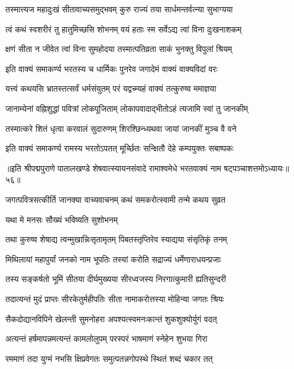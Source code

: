 \twolineshloka
{तस्मात्त्यज महादुःखं सीतावाच्यसमुद्भवम्}
{कुरु राज्यं तया सार्धमन्तर्वत्न्या सुभाग्यया}%

\twolineshloka
{त्वं कथं स्वशरीरं तु हातुमिच्छसि शोभनम्}
{वयं हताः स्म सर्वेऽद्य त्वां विना दुःखनाशकम्}%

\twolineshloka
{क्षणं सीता न जीवेत त्वां विना सुमहोदया}
{तस्मात्पतिव्रता साकं भुनक्तु विपुलां श्रियम्}%

\twolineshloka
{इति वाक्यं समाकर्ण्य भरतस्य च धार्मिकः}
{पुनरेव जगादेमं वाक्यं वाक्यविदां वरः}%

\twolineshloka
{यत्त्वं कथयसि भ्रातस्तत्सर्वं धर्मसंयुतम्}
{परं यद्वच्म्यहं वाक्यं तत्कुरुष्व ममाज्ञया}%

\twolineshloka
{जानाम्येनां वह्निशुद्धां पवित्रां लोकपूजिताम्}
{लोकापवादाद्भीतोऽहं त्यजामि स्वां तु जानकीम्}%

\twolineshloka
{तस्मात्करे शितं धृत्वा करवालं सुदारुणम्}
{शिरश्छिन्ध्यथवा जायां जानकीं मुञ्च वै वने}%

\twolineshloka
{इति वाक्यं समाकर्ण्य रामस्य भरतोऽपतत्}
{मूर्च्छितः सन्क्षितौ देहे कम्पयुक्तः सबाष्पकः}%

॥इति श्रीपद्मपुराणे पातालखण्डे शेषवात्स्यायनसंवादे रामाश्वमेधे भरतवाक्यं नाम षट्पञ्चाशत्तमोऽध्यायः॥५६॥



\twolineshloka
{जगत्पवित्रसत्कीर्ति जानक्या वाच्यवाचनम्}
{कथं समकरोत्स्वामी तन्मे कथय सुव्रत}%

यथा मे मनसः सौख्यं भविष्यति सुशोभनम्

\twolineshloka
{तथा कुरुष्व शेषाद्य त्वन्मुखान्निःसृतामृतम्}
{पिबतस्तृप्तिरेव स्याद्यया संसृतिकृं तनम्}%


\twolineshloka
{मिथिलायां महापुर्यां जनको नाम भूपतिः}
{तस्यां करोति सद्राज्यं धर्मेणाराधयन्प्रजाः}%

\twolineshloka
{तस्य सङ्कर्षतो भूमिं सीतया दीर्घमुख्यया}
{सीरध्वजस्य निरगात्कुमारी ह्यतिसुन्दरी}%

\twolineshloka
{तदात्यन्तं मुदं प्राप्तः सीरकेतुर्महीपतिः}
{सीता नामाकरोत्तस्या मोहिन्या जगतः श्रियः}%

\twolineshloka
{सैकदोद्यानविपिने खेलन्ती सुमनोहरा}
{अपश्यत्स्वमनःकान्तं शुकशुक्योर्युगं वदत्}%

\twolineshloka
{अत्यन्तं हर्षमापन्नमत्यन्तं कामलोलुपम्}
{परस्परं भाषमाणं स्नेहेन शुभया गिरा}%

\twolineshloka
{रममाणं तदा युग्मं नभसि क्षिप्रवेगतः}
{समुत्पतन्नगोपस्थे स्थितं शब्दं चकार तत्}%

